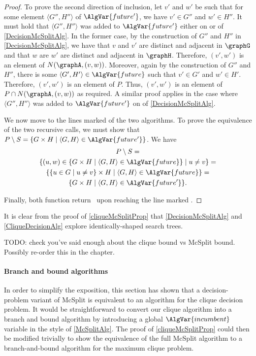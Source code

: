 \begin{proof}
    To prove the second direction of inclusion, let $v'$ and $w'$ be such that for
    some element $\langle G'',H'' \rangle$ of $\AlgVar{future'}$, we have
    $v' \in G''$ and $w' \in H''$.  It must hold that 
    $\langle G'',H'' \rangle$ was added to $\AlgVar{future'}$ either on
     or  of
    \cref{DecisionMcSplitAlg}. In the former case, by the construction of $G''$ and $H''$
    in \cref{DecisionMcSplitAlg}, we have that $v$ and $v'$ are distinct and adjacent
    in $\graphG$ and that $w$ are $w'$ are distinct and adjacent in $\graphH$.
    Therefore, $(v',w')$ is an element
    of $N(\graphA, (v,w))$.
    Moreover, again by the construction of $G''$ and $H''$,
    there is some $\langle G',H' \rangle \in \AlgVar{future}$ such that
    $v' \in G'$ and $w' \in H'$.
    Therefore, $(v',w')$ is an element of $P$.
    Thus, $(v',w')$ is an element of $P \cap N(\graphA, (v,w))$ as required.
    A similar proof applies in the case where
    $\langle G'',H'' \rangle$ was added to $\AlgVar{future'}$ on
     of \cref{DecisionMcSplitAlg}.

    We now move to the lines marked  of the two algorithms. 
    To prove the equivalence of the two recursive calls, we must show that
    $P \setminus S = \{G \times H \mid \langle G,H \rangle \in \AlgVar{future'}\}$. We have
\begin{gather}
    P \setminus S = \\
    \{(u,w) \in \{G \times H \mid \langle G,H \rangle \in \AlgVar{future}\} \mid u \not= v\} = \\
    \{\{u \in G \mid u \not= v\} \times H \mid \langle G,H \rangle \in \AlgVar{future}\} = \\
    \{G \times H \mid \langle G,H \rangle \in \AlgVar{future'}\}.
\end{gather}

    Finally, both function return \boolF\ upon reaching the line marked .
\end{proof}

It is clear from the proof of \cref{cliqueMcSplitProp} that \cref{DecisionMcSplitAlg}
and \cref{CliqueDecisionAlg} explore identically-shaped search trees.

TODO: check you've said enough about the clique bound vs McSplit bound. Possibly
re-order this in the chapter.

\paragraph{Branch and bound algorithms}
In order to simplify the exposition, this section has shown that a
decision-problem variant of McSplit is equivalent to an algorithm
for the clique decision problem.  It would be straightforward to convert our clique
algorithm into a branch and bound algorithm by introducing a global $\AlgVar{incumbent}$
variable in the style of \cref{McSplitAlg}.  The proof of \cref{cliqueMcSplitProp} could
then be modified trivially to show the equivalence of the full McSplit algorithm to
a branch-and-bound algorithm for the maximum clique problem.

